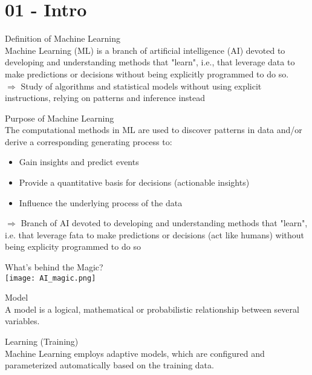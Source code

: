 \section{01 - Intro}


\begin{definition}{Definition of Machine Learning}\\
    Machine Learning (ML) is a branch of artificial intelligence (AI) devoted to developing and understanding methods that "learn", i.e., that leverage data to make predictions or decisions without being explicitly programmed to do so.\\
    $\Rightarrow$ Study of algorithms and statistical models without using explicit instructions, relying on patterns and inference instead
\end{definition}

\begin{concept}{Purpose of Machine Learning}\\
The computational methods in ML are used to discover patterns in data and/or derive a corresponding generating process to:
\begin{itemize}
    \item Gain insights and predict events
    \item Provide a quantitative basis for decisions (actionable insights)
    \item Influence the underlying process of the data
\end{itemize}
$\Rightarrow$ Branch of AI devoted to developing and understanding methods that "learn", i.e. that leverage fata to make predictions or decisions (act like humans) without being explicity programmed to do so
\end{concept}

\begin{definition}{What's behind the Magic?} \\
    \texttt{[image: AI\_magic.png]}
\end{definition}

\begin{definition}{Model}\\
A model is a logical, mathematical or probabilistic relationship between several variables.
\end{definition}

\begin{definition}{Learning (Training)}\\
Machine Learning employs adaptive models, which are configured and parameterized automatically based on the training data.
\end{definition}

